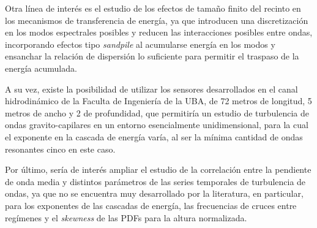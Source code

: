 Otra línea de interés es el estudio de los efectos de tamaño finito del recinto en los mecanismos de transferencia de energía, ya que introducen una discretización en los modos espectrales posibles y reducen las interacciones posibles entre ondas, incorporando efectos tipo \textit{sandpile} al acumularse energía en los modos y ensanchar la relación de dispersión lo suficiente para permitir el traspaso de la energía acumulada. %

A su vez, existe la posibilidad de utilizar los sensores desarrollados en el canal hidrodinámico de la Faculta de Ingeniería de la UBA, de 72 metros de longitud, 5 metros de ancho y 2 de profundidad, que permitiría un estudio de turbulencia de ondas gravito-capilares en un entorno esencialmente unidimensional, para la cual el exponente en la cascada de energía varía, al ser la mínima cantidad de ondas resonantes cinco en este caso.  %

Por último, sería de interés ampliar el estudio de la correlación entre la pendiente de onda media y distintos parámetros de las series temporales de turbulencia de ondas, ya que no se encuentra muy desarrollado por la literatura, en particular, para los exponentes de las cascadas de energía, las frecuencias de cruces entre regímenes y el \textit{skewness} de las PDFs para la altura normalizada. %

%
%
%
%
